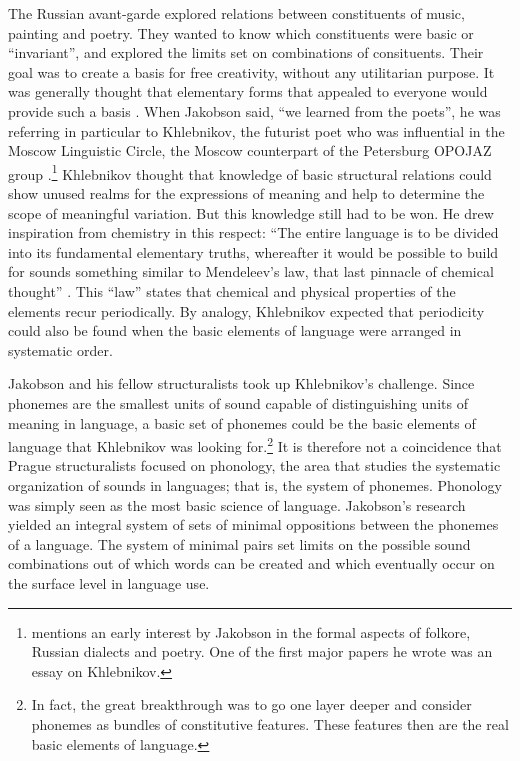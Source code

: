 \documentclass[output=paper]{langscibook}
\begin{document}
The Russian avant-garde explored relations between constituents of music, painting and poetry. They wanted to know which constituents were basic or ``invariant'', and explored the limits set on combinations of consituents. Their goal was to create a basis for free creativity, without any utilitarian purpose. It was generally thought that elementary forms that appealed to everyone would provide such a basis \citep[238--239]{Toman1995}. When Jakobson said, ``we learned from the poets'', he was referring in particular to Khlebnikov, the futurist poet who was influential in the Moscow Linguistic Circle, the Moscow counterpart of the Petersburg OPOJAZ group \citep[see][]{Jakobson1979}.\footnote{ \citet[10--11]{Toman1995} mentions an early interest by Jakobson in the formal aspects of folkore, Russian dialects and poetry. One of the first major papers he wrote was an essay on Khlebnikov.} Khlebnikov thought that knowledge of basic structural relations could show unused realms for the expressions of meaning and help to determine the scope of meaningful variation. But this knowledge still had to be won. He drew inspiration from chemistry in this respect: ``The entire language is to be divided into its fundamental elementary truths, whereafter it would be possible to build for sounds something similar to Mendeleev's law, that last pinnacle of chemical thought'' \citep[Khlebnikov as translated in][95]{Gasparov2014}. This ``law'' states that chemical and physical properties of the elements recur periodically. By analogy, Khlebnikov expected that periodicity could also be found when the basic elements of language were arranged in systematic order. 

Jakobson and his fellow structuralists took up Khlebnikov's challenge. Since phonemes are the smallest units of sound capable of distinguishing units of meaning in language, a basic set of phonemes could be the basic elements of language that Khlebnikov was looking for.\footnote{In fact, the great breakthrough was to go one layer deeper and consider phonemes as bundles of constitutive features. These features then are the real basic elements of language.} It is therefore not a coincidence that Prague structuralists focused on phonology, the area that studies the systematic organization of sounds in languages; that is, the system of phonemes. Phonology was simply seen as the most basic science of language. Jakobson's research yielded an integral system of sets of minimal oppositions between the phonemes of a language. The system of minimal pairs set limits on the possible sound combinations out of which words can be created and which eventually occur on the surface level in language use. 
\end{document}
